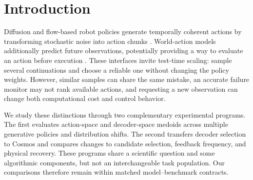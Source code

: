 \begin{abstract}
Generative robot policies produce multiple plausible action chunks, but
agreement among predictions need not identify a successful action. We examine
test-time selection through complementary evaluations of action-space and
decoder-space medoids on MIMIC-Video, GR00T N1.7, Xiaomi Robotics 0, and Cosmos
Policy. We preserve the distinct benchmark populations and execution
contracts rather than pooling their success rates. Three-seed GR00T results
show mean decoder-medoid gains of 4.51 percentage points on SIMPLER and 3.65
on INT-ACT, but the corresponding Xiaomi effects are negative. In a matched
Cosmos transfer study, decoder medoid and joint-value selection each achieve
112/180 successes, with seven rescues and seven harms. Decoder selection
strongly favors particular fixed noise seeds, motivating controls that
separate representation agreement from seed identity. Complementary feedback
and physical-recovery studies distinguish selecting another prediction from
obtaining another observation or changing the physical state. Large historical
recovery gains are local: a corrected-runtime broad comparison finds no
significant aggregate improvement. These results motivate a controlled
evaluation of state risk, candidate quality, and intervention benefit as
different quantities, not a claim of a universally better planner.
\end{abstract}

\section{Introduction}
Diffusion and flow-based robot policies generate temporally coherent actions
by transforming stochastic noise into action chunks \citep{diffusion_policy}.
World-action models additionally predict future observations, potentially
providing a way to evaluate an action before execution
\citep{cosmos_policy,mimic_video}. These interfaces invite test-time scaling:
sample several continuations and choose a reliable one without changing the
policy weights. However, similar samples can share the same mistake, an
accurate failure monitor may not rank available actions, and requesting a
new observation can change both computational cost and control behavior.

We study these distinctions through two complementary experimental programs.
The first evaluates action-space and decoder-space medoids across multiple
generative policies and distribution shifts. The second transfers decoder
selection to Cosmos and compares changes to candidate selection, feedback
frequency, and physical recovery. These programs share a scientific question
and some algorithmic components, but not an interchangeable task population.
Our comparisons therefore remain within matched model--benchmark contracts.

